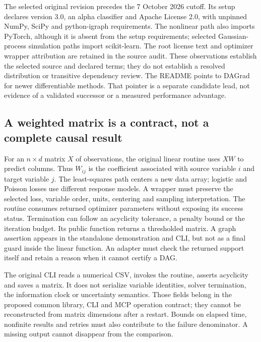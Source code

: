 The selected original revision precedes the 7 October 2026 cutoff. Its
setup declares version 3.0, an alpha classifier and Apache License 2.0,
with unpinned NumPy, SciPy and python-igraph requirements. The nonlinear
path also imports PyTorch, although it is absent from the setup requirements;
selected Gaussian-process simulation paths import scikit-learn. The root
license text and optimizer wrapper attribution are retained in the source
audit. These observations establish the selected source and declared terms;
they do not establish a resolved distribution or transitive dependency review.
The README points to DAGrad for newer differentiable methods. That pointer is
a separate candidate lead, not evidence of a validated successor or a measured
performance advantage.~\citep{exec23_notears_source}

\subsection{A weighted matrix is a contract, not a complete causal result}
\label{exec23:notears-matrix}
For an $n\times d$ matrix $X$ of observations, the original linear routine uses
$XW$ to predict columns. Thus $W_{ij}$ is the coefficient associated with
source variable $i$ and target variable $j$. The least-squares path centers a
new data array; logistic and Poisson losses use different response models.
A wrapper must preserve the selected loss, variable order, units, centering
and sampling interpretation. The routine consumes returned optimizer
parameters without exposing its success status. Termination can follow an
acyclicity tolerance, a penalty bound or the iteration budget. Its public
function returns a thresholded matrix. A graph assertion appears in the
standalone demonstration and CLI, but not as a final guard inside the linear
function. An adapter must check the returned support itself and retain a
reason when it cannot certify a DAG.~\citep{exec23_notears_source}

The original CLI reads a numerical CSV, invokes the routine, asserts
acyclicity and saves a matrix. It does not serialize variable identities,
solver termination, the information clock or uncertainty semantics. Those
fields belong in the proposed common library, CLI and MCP operation contract;
they cannot be reconstructed from matrix dimensions after a restart. Bounds on
elapsed time, nonfinite results and retries must also contribute to the failure
denominator. A missing output cannot disappear from the comparison.
\citep{exec23_notears_source}

